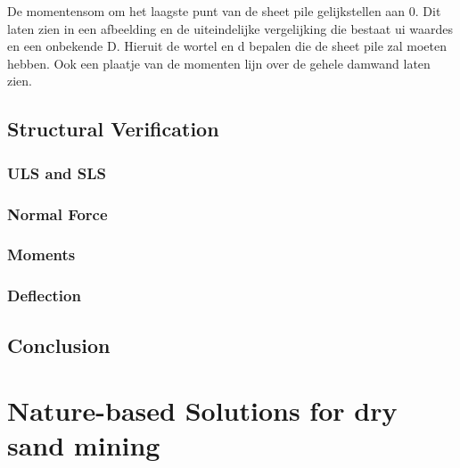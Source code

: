 De momentensom om het laagste punt van de sheet pile gelijkstellen aan 0. Dit laten zien in een afbeelding en de uiteindelijke vergelijking die bestaat ui waardes en een onbekende D. Hieruit de wortel en d bepalen die de sheet pile zal moeten hebben. Ook een plaatje van de momenten lijn over de gehele damwand laten zien.

\subsection{Structural Verification}

\subsubsection{ULS and SLS}

\subsubsection{Normal Force}

\subsubsection{Moments}

\subsubsection{Deflection}

\subsection{Conclusion}

\section{Nature-based Solutions for dry sand mining}